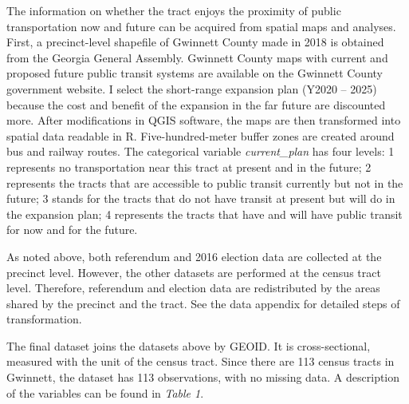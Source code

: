 \documentclass[
]{article}
\begin{document}
The information on whether the tract enjoys the proximity of public
transportation now and future can be acquired from spatial maps and
analyses. First, a precinct-level shapefile of Gwinnett County made in
2018 is obtained from the Georgia General Assembly. Gwinnett County maps
with current and proposed future public transit systems are available on
the Gwinnett County government website. I select the short-range
expansion plan (Y2020 -- 2025) because the cost and benefit of the
expansion in the far future are discounted more. After modifications in
QGIS software, the maps are then transformed into spatial data readable
in R. Five-hundred-meter buffer zones are created around bus and railway
routes. The categorical variable \emph{current\_plan} has four levels: 1
represents no transportation near this tract at present and in the
future; 2 represents the tracts that are accessible to public transit
currently but not in the future; 3 stands for the tracts that do not
have transit at present but will do in the expansion plan; 4 represents
the tracts that have and will have public transit for now and for the
future.

As noted above, both referendum and 2016 election data are collected at
the precinct level. However, the other datasets are performed at the
census tract level. Therefore, referendum and election data are
redistributed by the areas shared by the precinct and the tract. See the
data appendix for detailed steps of transformation.

The final dataset joins the datasets above by GEOID. It is
cross-sectional, measured with the unit of the census tract. Since there
are 113 census tracts in Gwinnett, the dataset has 113 observations,
with no missing data. A description of the variables can be found in
\emph{Table 1}.
\end{document}

